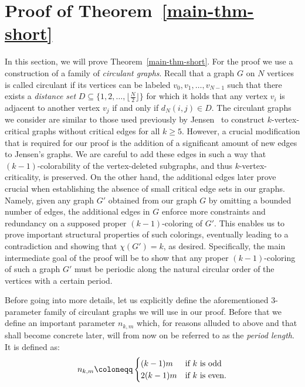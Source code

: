 \documentclass[a4paper,10pt,hidelinks]{amsart}
\theoremstyle{definition}
\begin{document}
\section{Proof of Theorem~\ref{main-thm-short}}\label{sec:main}
In this section, we will prove Theorem~\ref{main-thm-short}. For the proof we use a construction of a family of \emph{circulant graphs}. Recall that a graph $G$ on $N$ vertices is called circulant if its vertices can be labeled $v_0, v_1, \dots, v_{N - 1}$ such that there exists a \emph{distance set} $D \subseteq \{1, 2, \dots, \lfloor\frac{N}{2}\rfloor\}$ for which it holds that any vertex $v_i$ is adjacent to another vertex $v_j$ if and only if $d_N(i, j) \in D$. The circulant graphs we consider are similar to those used previously by Jensen~\cite{jensen} to construct $k$-vertex-critical graphs without critical edges for all $k\ge 5$. However, a crucial modification that is required for our proof is the addition of a significant amount of new edges to Jensen's graphs. We are careful to add these edges in such a way that $(k-1)$-colorability of the vertex-deleted subgraphs, and thus $k$-vertex-criticality, is preserved. On the other hand, the additional edges later prove crucial when establishing the absence of small critical edge sets in our graphs. Namely, given any graph $G'$ obtained from our graph $G$ by omitting a bounded number of edges, the additional edges in $G$ enforce more constraints and redundancy on a supposed proper $(k-1)$-coloring of $G'$. This enables us to prove important structural properties of such colorings, eventually leading to a contradiction and showing that $\chi(G')=k$, as desired. Specifically, the main intermediate goal of the proof will be to show that any proper $(k-1)$-coloring of such a graph $G'$ must be periodic along the natural circular order of the vertices with a certain period.

Before going into more details, let us explicitly define the aforementioned $3$-parameter family of circulant graphs we will use in our proof. Before that we define an important parameter $n_{k,m}$ which, for reasons alluded to above and that shall become concrete later, will from now on be referred to as the \emph{period length}. It is defined as:
    \begin{equation}\notag
        n_{k,m} \coloneqq 
        \begin{cases}
        (k - 1)m & \text{if } k \text{ is odd} \\
        2(k - 1)m & \text{if } k \text{ is even}.
        \end{cases}
    \end{equation}
\end{document}
